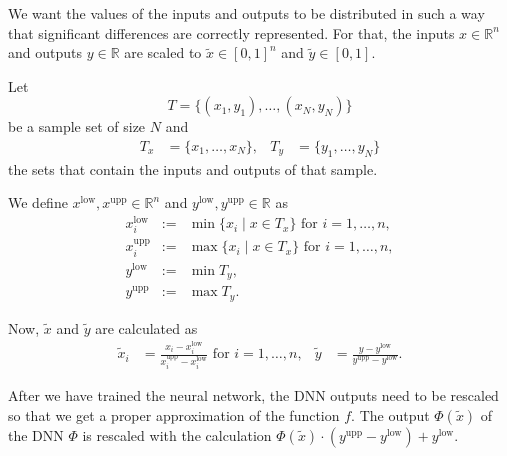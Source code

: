We want the values of the inputs and outputs to be distributed in such a way that significant differences are correctly represented. For that, the inputs $x\in\mathbb{R}^n$ and outputs $y\in\mathbb{R}$ are scaled to $\tilde{x}\in[0,1]^n$ and $\tilde{y}\in[0,1]$.

Let
\begin{equation}
T=\{(x_1,y_1),\dotsc,(x_N,y_N)\}
\end{equation}
be a sample set of size $N$ and
\begin{align*}
T_x&=\{x_1,\dotsc,x_N\},&T_y&=\{y_1,\dotsc,y_N\}
\end{align*}
the sets that contain the inputs and outputs of that sample.

We define $x^\mathrm{low}, x^\mathrm{upp}\in\mathbb{R}^n$ and $y^\mathrm{low}, y^\mathrm{upp}\in\mathbb{R}$ as
\begin{eqnarray}
\label{minIn}
x^\mathrm{low}_i&:=&\operatorname*{min}\{x_i\mid x\in T_x\}\text{ for }i=1,\dotsc,n,\\
\label{maxIn}
x^\mathrm{upp}_i&:=&\operatorname*{max}\{x_i\mid x\in T_x\}\text{ for }i=1,\dotsc,n,\\
\label{minOut}
y^\mathrm{low}&:=&\operatorname*{min}T_y,\\
\label{maxOut}
y^\mathrm{upp}&:=&\operatorname*{max}T_y.
\end{eqnarray}

Now, $\tilde{x}$ and $\tilde{y}$ are calculated as
\begin{align}
\label{scalingToZeroOne}
\tilde{x}_i&=\frac{x_i-x^\mathrm{low}_i}{x^\mathrm{upp}_i-x^\mathrm{low}_i}\text{ for }i=1,\dotsc,n,&\tilde{y}&=\frac{y-y^\mathrm{low}}{y^\mathrm{upp}-y^\mathrm{low}}.
\end{align}

After we have trained the neural network, the DNN outputs need to be rescaled so that we get a proper approximation of the function $f$. The output $\Phi(\tilde{x})$ of the DNN $\Phi$ is rescaled with the calculation $\Phi(\tilde{x})\cdot(y^\mathrm{upp}-y^\mathrm{low})+y^\mathrm{low}$.


